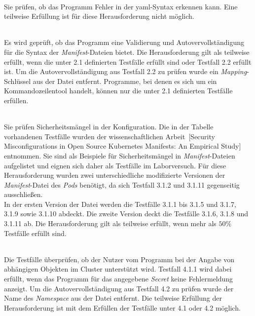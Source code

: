 \begin{description}
    \setlength\itemsep{-0.5cm}
    \item[Testfälle für Herausforderung 1]{~\\}
          Sie prüfen, ob das Programm Fehler in der \ac{yaml}-Syntax erkennen kann.
          Eine teilweise Erfüllung ist für diese Herausforderung nicht möglich.
    \item[Testfälle für Herausforderung 2]{~\\}
          Es wird geprüft, ob das Programm eine Validierung und Autovervollständigung für die Syntax der \textit{Manifest}-Dateien
          bietet. Die Herausforderung gilt als teilweise erfüllt, wenn die unter 2.1 definierten Testfälle erfüllt sind oder Testfall 2.2 erfüllt ist.
          Um die Autovervollständigung aus Testfall 2.2 zu prüfen wurde ein \textit{Mapping}-Schlüssel aus der Datei entfernt.
          Programme, bei denen es sich um ein Kommandozeilentool handelt, können nur die unter 2.1 definierten Testfälle erfüllen.
    \item[Testfälle für Herausforderung 3]{~\\}
          Sie prüfen Sicherheitsmängel in der Konfiguration. Die in der Tabelle vorhandenen Testfälle wurden
          der wissenschaftlichen Arbeit~\cite{10.1145/3579639}[Security Misconfigurations in Open Source Kubernetes Manifests: An Empirical Study]
          entnommen. Sie sind als Beispiele für Sicherheitsmängel in \textit{Manifest}-Dateien aufgelistet und eignen sich daher als Testfälle im Laborversuch.
          Für diese Herausforderung wurden zwei unterschiedliche modifizierte Versionen der \textit{Manifest}-Datei des \textit{Pods} benötigt,
          da sich Testfall 3.1.2 und 3.1.11 gegenseitig ausschließen.
          \\
          In der ersten Version der Datei werden die Testfälle 3.1.1 bis 3.1.5 und 3.1.7, 3.1.9 sowie 3.1.10 abdeckt.
          Die zweite Version deckt die Testfälle 3.1.6, 3.1.8 und 3.1.11 ab.
          Die Herausforderung gilt als teilweise erfüllt, wenn mehr als $50\%$ Testfälle erfüllt sind.

    \item[Testfälle für Herausforderung 4]{~\\}
          Die Testfälle überprüfen, ob der Nutzer vom Programm bei der Angabe von abhängigen Objekten im Cluster unterstützt wird.
          Testfall 4.1.1 wird dabei erfüllt, wenn das Programm für das angegebene \textit{Secret} keine Fehlermeldung anzeigt.
          Um die Autovervollständigung aus Testfall 4.2 zu prüfen wurde der Name des \textit{Namespace} aus der Datei entfernt.
          Die teilweise Erfüllung der Herausforderung ist mit dem Erfüllen der Testfälle unter 4.1 oder 4.2 möglich.
\end{description}

